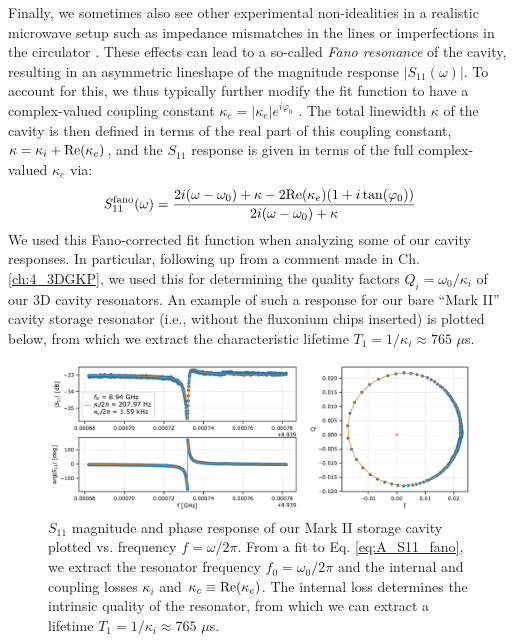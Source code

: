 Finally, we sometimes also see other experimental non-idealities in a realistic microwave setup such as impedance mismatches in the lines \cite{probst2015efficient} or imperfections in the circulator \cite{rieger2023fano}. These effects can lead to a so-called \textit{Fano resonance} of the cavity, resulting in an asymmetric lineshape of the magnitude response $|S_{11}(\omega)|$. To account for this, we thus typically further modify the fit function to have a complex-valued coupling constant $\kappa_e = |\kappa_e|e^{i\varphi_0}$ \cite{probst2015efficient}. The total linewidth $\kappa$ of the cavity is then defined  in terms of the real part of this coupling constant, $\kappa = \kappa_i + {\rm Re}(\kappa_e)$, and the $S_{11}$ response is given in terms of the full complex-valued $\kappa_e$ via:
\begin{equation}
    S_{11}^{\rm fano}(\omega) = \frac{2i(\omega-\omega_0) + \kappa -  2{\rm Re}(\kappa_e)(1+i\tan(\varphi_0))}{2i(\omega-\omega_0) + \kappa}
    \label{eq:A_S11_fano}
\end{equation}
We used this Fano-corrected fit function when analyzing some of our cavity responses. In particular, following up from a comment made in Ch. \ref{ch:4_3DGKP}, we used this for determining the quality factors $Q_i = \omega_0/\kappa_i$ of our 3D cavity resonators. An example of such a response for our bare ``Mark II'' cavity storage resonator (i.e., without the fluxonium chips inserted) is plotted below, from which we extract the characteristic lifetime $T_1 = 1/\kappa_i \approx 765$ $\mu$s. 
\begin{figure}[h]
    \centering
    \includegraphics[width=\linewidth]{Figures/A/Storage_Res_S11_Fit.pdf}
    \caption{$S_{11}$ magnitude and phase response of our Mark II storage cavity plotted vs. frequency $f = \omega/2\pi$. From a fit to Eq. \eqref{eq:A_S11_fano}, we extract the resonator frequency $f_0 = \omega_0/2\pi$ and the internal and coupling losses $\kappa_i$ and $\kappa_c \equiv {\rm Re}(\kappa_e)$. The internal loss determines the intrinsic quality of the resonator, from which we can extract a lifetime $T_1 = 1/\kappa_i \approx 765$ $\mu$s.}
    \label{fig:A_Storage_Res_S11_Fit}
\end{figure}